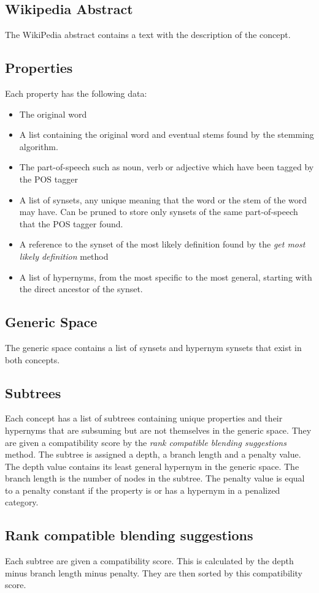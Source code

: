 \subsection{Wikipedia Abstract}
The WikiPedia abstract contains a text with the description of the concept.

\subsection{Properties}
Each property has the following data:
\begin{itemize}
\item The original word
\item A list containing the original word and eventual stems found by the stemming algorithm.
\item The part-of-speech such as noun, verb or adjective which have been tagged by the POS tagger
\item A list of synsets, any unique meaning that the word or the stem of the word may have. Can be pruned to store only synsets of the same part-of-speech that the POS tagger found.
\item A reference to the synset of the most likely definition found by the \emph{get most likely definition} method
\item A list of hypernyms, from the most specific to the most general, starting with the direct ancestor of the synset.
\end{itemize}

\subsection{Generic Space}
The generic space contains a list of synsets and hypernym synsets that exist in both concepts.

\subsection{Subtrees}
Each concept has a list of subtrees containing unique properties and their hypernyms that are subsuming but are not themselves in the generic space. They are given a compatibility score by the \emph{rank compatible blending suggestions} method. The subtree is assigned a depth, a branch length and a penalty value. The depth value contains its least general hypernym in the generic space.
The branch length is the number of nodes in the subtree. The penalty value is equal to a penalty constant if the property is or has a hypernym in a penalized category.

\subsection{Rank compatible blending suggestions}
Each subtree are given a compatibility score. This is calculated by the depth minus branch length minus penalty. They are then sorted by this compatibility score.

